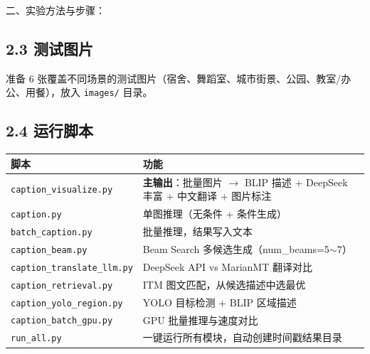 \documentclass[12pt, a4paper]{article}
\begin{document}
\begin{labbox}{二、实验方法与步骤：}{}
\subsection*{2.3 测试图片}

准备 6 张覆盖不同场景的测试图片（宿舍、舞蹈室、城市街景、公园、教室/办公、用餐），放入 \texttt{images/} 目录。

\subsection*{2.4 运行脚本}

\begin{center}
\begin{tabular}{|l|p{10cm}|}
    \hline
    \textbf{脚本} & \textbf{功能} \\
    \hline
    \texttt{caption\_visualize.py} & \textbf{主输出}：批量图片 $\rightarrow$ BLIP 描述 + DeepSeek 丰富 + 中文翻译 + 图片标注 \\
    \texttt{caption.py} & 单图推理（无条件 + 条件生成） \\
    \texttt{batch\_caption.py} & 批量推理，结果写入文本 \\
    \texttt{caption\_beam.py} & Beam Search 多候选生成（num\_beams=5$\sim$7） \\
    \texttt{caption\_translate\_llm.py} & DeepSeek API vs MarianMT 翻译对比 \\
    \texttt{caption\_retrieval.py} & ITM 图文匹配，从候选描述中选最优 \\
    \texttt{caption\_yolo\_region.py} & YOLO 目标检测 + BLIP 区域描述 \\
    \texttt{caption\_batch\_gpu.py} & GPU 批量推理与速度对比 \\
    \texttt{run\_all.py} & 一键运行所有模块，自动创建时间戳结果目录 \\
    \hline
\end{tabular}
\end{center}

\end{labbox}
\end{document}
